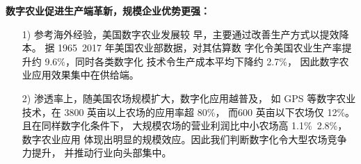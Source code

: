 \documentclass[a4paper]{article}
\begin{document}
\noindent
\textbf{数字农业促进生产端革新，规模企业优势更强：}
\begin{itemize}
	\item [1)]
	      参考海外经验，美国数字农业发展较
	      早，主要通过改善生产方式以提效降本。
	      据 1965~2017 年美国农业部数据，对其估算数
	      字化令美国农业生产率提升约 9.6\%，同时各类数字化
	      技术令生产成本平均下降约 2.7\%，
	      因此数字农业应用效果集中在供给端。
	\item [2)]
	      渗透率上，随美国农场规模扩大，数字化应用越普及，
	      如 GPS 等数字农业技术，在 3800 英亩以上农场的应用率超 80\%，
	      而600 英亩以下农场仅 12\%。且在同样数字化条件下，
	      大规模农场的营业利润比中小农场高 1.1\%~2.8\%，数字农业应用
	      体现出明显的规模效应。因此我们判断数字化令大型农场竞争力提升，
	      并推动行业向头部集中。
\end{itemize}
\end{document}

